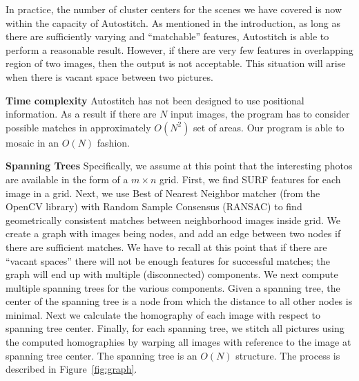 \documentclass[10pt,twocolumn,letterpaper]{article}
\begin{document}
In practice, the number of cluster centers for the scenes we have
covered is now within the capacity of Autostitch.  As mentioned in the
introduction, as long as there are sufficiently varying and
``matchable'' features, Autostitch is able to perform a reasonable
result.  However, if there are very few features in overlapping region
of two images, then the output is not acceptable. This situation will
arise when there is vacant space between two pictures.

{\bf Time complexity} Autostitch has not been designed
to use positional information. As a result if there are $N$ input
images, the program has to consider possible matches in approximately
$O(N^2)$ set of areas.  Our program is able to mosaic in an $O(N)$
fashion.

{\bf Spanning Trees}
Specifically, we assume at this point that the interesting photos are
available in the form of a $m \times n$ grid. First, we find SURF
\cite{Bay} features for each image in a grid. Next, we use Best of
Nearest Neighbor matcher (from the OpenCV library) with Random Sample
Consensus (RANSAC) \cite{Fischler1981} to find geometrically
consistent matches between neighborhood images inside grid.  We
create a graph with images being nodes, and add an edge between two
nodes if there are sufficient matches. We have to recall at this point
that if there are ``vacant spaces'' there will not be enough features
for successful matches; the graph will end up with multiple
(disconnected) components.  We next compute multiple spanning trees
for the various components. Given a spanning tree, the center of the
spanning tree is a node from which the distance to all other nodes is
minimal. Next we calculate the homography of each image with respect
to spanning tree center.  Finally, for each spanning tree, we stitch
all pictures using the computed homographies by warping all images
with reference to the image at spanning tree center. The spanning tree is
an $O(N)$ structure. The process is described in
Figure~\ref{fig:graph}.
\end{document}

